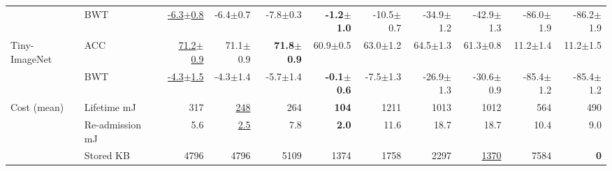 \begin{tabular}{llrrrrrrrrr}
 & BWT & \underline{-6.3{\tiny$\pm$0.8}} & -6.4{\tiny$\pm$0.7} & -7.8{\tiny$\pm$0.3} & \textbf{-1.2{\tiny$\pm$1.0}} & -10.5{\tiny$\pm$0.7} & -34.9{\tiny$\pm$1.2} & -42.9{\tiny$\pm$1.3} & -86.0{\tiny$\pm$1.9} & -86.2{\tiny$\pm$1.9} \\
Tiny-ImageNet & ACC & \underline{71.2{\tiny$\pm$0.9}} & 71.1{\tiny$\pm$0.9} & \textbf{71.8{\tiny$\pm$0.9}} & 60.9{\tiny$\pm$0.5} & 63.0{\tiny$\pm$1.2} & 64.5{\tiny$\pm$1.3} & 61.3{\tiny$\pm$0.8} & 11.2{\tiny$\pm$1.4} & 11.2{\tiny$\pm$1.5} \\
 & BWT & \underline{-4.3{\tiny$\pm$1.5}} & -4.3{\tiny$\pm$1.4} & -5.7{\tiny$\pm$1.4} & \textbf{-0.1{\tiny$\pm$0.6}} & -7.5{\tiny$\pm$1.3} & -26.9{\tiny$\pm$1.3} & -30.6{\tiny$\pm$0.9} & -85.4{\tiny$\pm$1.2} & -85.4{\tiny$\pm$1.2} \\
\midrule
Cost (mean) & Lifetime mJ & 317 & \underline{248} & 264 & \textbf{104} & 1211 & 1013 & 1012 & 564 & 490 \\
 & Re-admission mJ & 5.6 & \underline{2.5} & 7.8 & \textbf{2.0} & 11.6 & 18.7 & 18.7 & 10.4 & 9.0 \\
 & Stored KB & 4796 & 4796 & 5109 & 1374 & 1758 & 2297 & \underline{1370} & 7584 & \textbf{0} \\
\bottomrule
\end{tabular}
